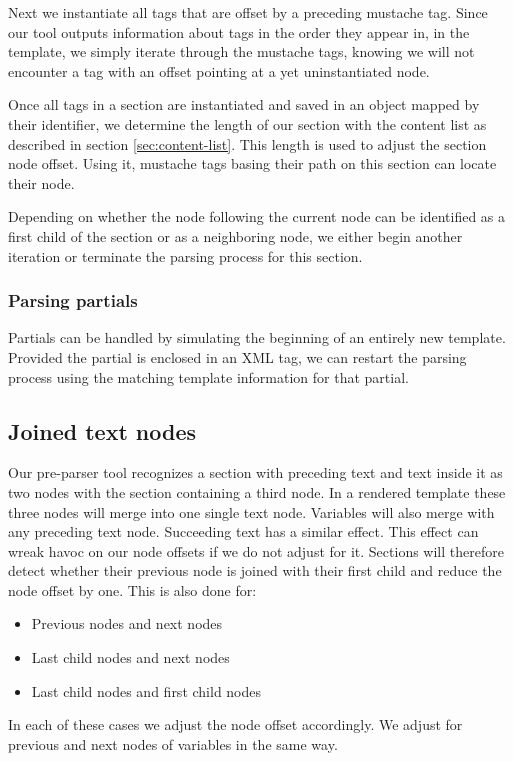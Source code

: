 \documentclass[thesis.tex]{subfiles}
\begin{document}
Next we instantiate all tags that are offset by a preceding mustache tag.
Since our tool outputs information about tags in the order they appear in, in the
template, we simply iterate through the mustache tags, knowing we will not
encounter a tag with an offset pointing at a yet uninstantiated node.

Once all tags in a section are instantiated and saved in an object mapped by
their identifier, we determine the length of our section with the content list
as described in section \ref{sec:content-list}. This length is used to adjust
the section node offset. Using it, mustache tags basing their path on this
section can locate their node.

Depending on whether the node following the current node can be identified as
a first child of the section or as a neighboring node, we either begin another
iteration or terminate the parsing process for this section.

\subsubsection{Parsing partials}
\label{sec:parsing-partials}
Partials can be handled by simulating the beginning of an entirely new template.
Provided the partial is enclosed in an XML tag, we can
restart the parsing process using the matching template information for that
partial.

\subsection{Joined text nodes}
\label{sec:joined}
Our pre-parser tool recognizes a section with preceding text and text inside it
as two nodes with the section containing a third node. In a rendered template
these three nodes will merge into one single text node. Variables will also
merge with any preceding text node. Succeeding text has a similar effect.
This effect can wreak havoc on our node offsets if we do not adjust for it.
Sections will therefore detect whether their previous node is joined with
their first child and reduce the node offset by one. This is also done for:
\begin{itemize}
\item Previous nodes and next nodes
\item Last child nodes and next nodes
\item Last child nodes and first child nodes
\end{itemize}
In each of these cases we adjust the node offset accordingly. We adjust
for previous and next nodes of variables in the same way.
\end{document}
